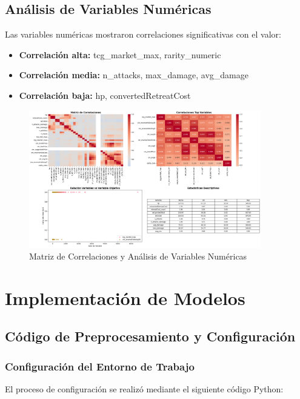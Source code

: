 \documentclass[12pt,letterpaper]{article}
\begin{document}
\subsection{Análisis de Variables Numéricas}

Las variables numéricas mostraron correlaciones significativas con el valor:
\begin{itemize}
    \item \textbf{Correlación alta:} tcg\_market\_max, rarity\_numeric
    \item \textbf{Correlación media:} n\_attacks, max\_damage, avg\_damage
    \item \textbf{Correlación baja:} hp, convertedRetreatCost
\end{itemize}

\begin{figure}[H]
\centering
\includegraphics[width=0.9\textwidth]{imagenes/figura_5_correlaciones.png}
\caption{Matriz de Correlaciones y Análisis de Variables Numéricas}
\label{fig:correlaciones}
\end{figure}

\section{Implementación de Modelos}

\subsection{Código de Preprocesamiento y Configuración}

\subsubsection{Configuración del Entorno de Trabajo}

El proceso de configuración se realizó mediante el siguiente código Python:
\end{document}
